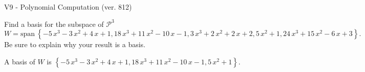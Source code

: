 \begin{exercise}
  \begin{exerciseTitle}V9 - Polynomial Computation (ver. 812)\end{exerciseTitle}
  \begin{exerciseStatement}
    Find a basis for the subspace of \(\mathcal{P}^3\) 
\[W=\mathrm{span}\ \left\{-5 \, x^{3} - 3 \, x^{2} + 4 \, x + 1 , 18 \, x^{3} + 11 \, x^{2} - 10 \, x - 1 , 3 \, x^{3} + 2 \, x^{2} + 2 \, x + 2 , 5 \, x^{2} + 1 , 24 \, x^{3} + 15 \, x^{2} - 6 \, x + 3\right\}.\]
 Be sure to explain why your result is a basis.


  \end{exerciseStatement}
  \begin{exerciseAnswer}
   A basis of \(W\) is  \(\left\{-5 \, x^{3} - 3 \, x^{2} + 4 \, x + 1 , 18 \, x^{3} + 11 \, x^{2} - 10 \, x - 1 , 5 \, x^{2} + 1\right\}\).
  


  \end{exerciseAnswer}
\end{exercise}